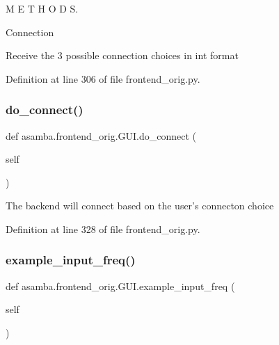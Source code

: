 M E T H O D S. 

Connection \begin{DoxyVerb}Receive the 3 possible connection choices in int format \end{DoxyVerb}
 

Definition at line 306 of file frontend\+\_\+orig.\+py.

\mbox{\label{classasamba_1_1frontend__orig_1_1_g_u_i_a68a716eaa1fb6d82a7b004c77a5ab270}} 
\subsubsection{\texorpdfstring{do\+\_\+connect()}{do\_connect()}}
{\footnotesize\ttfamily def asamba.\+frontend\+\_\+orig.\+G\+U\+I.\+do\+\_\+connect (\begin{DoxyParamCaption}\item[{}]{self }\end{DoxyParamCaption})}

\begin{DoxyVerb}The backend will connect based on the user's connecton choice \end{DoxyVerb}
 

Definition at line 328 of file frontend\+\_\+orig.\+py.

\mbox{\label{classasamba_1_1frontend__orig_1_1_g_u_i_a6bb5f142abc9b56ccc0d7f9f7b3b99f1}} 
\subsubsection{\texorpdfstring{example\+\_\+input\+\_\+freq()}{example\_input\_freq()}}
{\footnotesize\ttfamily def asamba.\+frontend\+\_\+orig.\+G\+U\+I.\+example\+\_\+input\+\_\+freq (\begin{DoxyParamCaption}\item[{}]{self }\end{DoxyParamCaption})}

